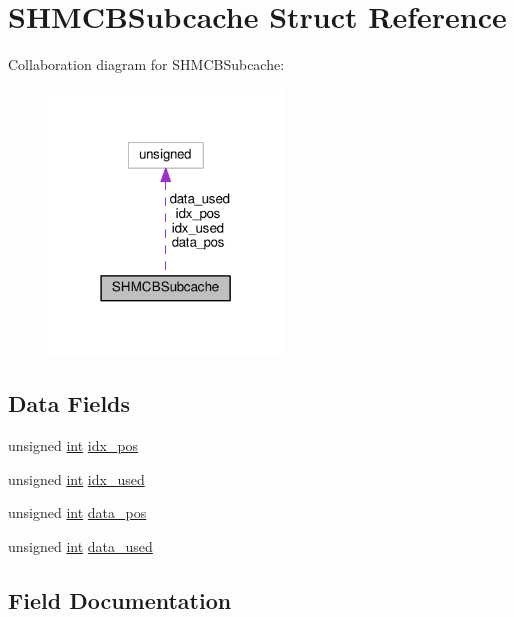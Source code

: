 \hypertarget{structSHMCBSubcache}{}\section{S\+H\+M\+C\+B\+Subcache Struct Reference}
\label{structSHMCBSubcache}


Collaboration diagram for S\+H\+M\+C\+B\+Subcache\+:
\nopagebreak
\begin{figure}[H]
\begin{center}
\leavevmode
\includegraphics[width=178pt]{structSHMCBSubcache__coll__graph}
\end{center}
\end{figure}
\subsection*{Data Fields}
\begin{DoxyCompactItemize}
\item 
unsigned \hyperlink{pcre_8txt_a42dfa4ff673c82d8efe7144098fbc198}{int} \hyperlink{structSHMCBSubcache_ae877bd76f8197ad01437c55d0cf1ab68}{idx\+\_\+pos}
\item 
unsigned \hyperlink{pcre_8txt_a42dfa4ff673c82d8efe7144098fbc198}{int} \hyperlink{structSHMCBSubcache_a3942b5817e88d59f8c330e93ec0094b6}{idx\+\_\+used}
\item 
unsigned \hyperlink{pcre_8txt_a42dfa4ff673c82d8efe7144098fbc198}{int} \hyperlink{structSHMCBSubcache_a441423e4aa2c20b4368df1079fda7e35}{data\+\_\+pos}
\item 
unsigned \hyperlink{pcre_8txt_a42dfa4ff673c82d8efe7144098fbc198}{int} \hyperlink{structSHMCBSubcache_a650116349bcf167b1f43e02aff27b21b}{data\+\_\+used}
\end{DoxyCompactItemize}


\subsection{Field Documentation}
